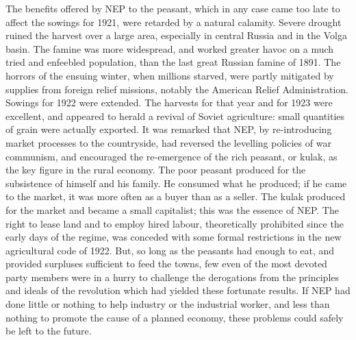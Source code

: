 The benefits offered by NEP to the peasant, which in any case came too late to affect the sowings for 1921, were retarded by a natural calamity. Severe drought ruined the harvest over a large area, especially in central Russia and in the Volga basin. The famine was more widespread, and worked greater havoc on a much tried and enfeebled population, than the last great Russian famine of 1891. The horrors of the ensuing winter, when millions starved, were partly mitigated by supplies from foreign relief missions, notably the American Relief Administration. Sowings for 1922 were extended. The harvests for that year and for 1923 were excellent, and appeared to herald a revival of Soviet agriculture: small quantities of grain were actually exported. It was remarked that NEP, by re-introducing market processes to the countryside, had reversed the levelling policies of war communism, and encouraged the re-emergence of the rich peasant, or kulak, as the key figure in the rural economy. The poor peasant produced for the subsistence of himself and his family. He consumed what he produced; if he came to the market, it was more often as a buyer than as a seller. The kulak produced for the market and became a small capitalist; this was the essence of NEP. The right to lease land and to employ hired labour, theoretically prohibited since the early days of the regime, was conceded with some formal restrictions in the new agricultural code of 1922. But, so long as the peasants had enough to eat, and provided surpluses sufficient to feed the towns, few even of the most devoted party members were in a hurry to challenge the derogations from the principles and ideals of the revolution which had yielded these fortunate results. If NEP had done little or nothing to help industry or the industrial worker, and less than nothing to promote the cause of a planned economy, these problems could safely be left to the future. 

